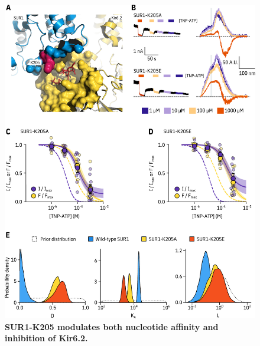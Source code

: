 \documentclass[9pt,lineno, onehalfspacing]{elife_modified}
\begin{document}
\begin{figure}
\begin{fullwidth}
\includegraphics[height=0.95\textheight]{figure_five}
\caption{\textbf{SUR1-K205 modulates both nucleotide affinity and inhibition of Kir6.2.}}
\label{fig:five}
\end{fullwidth}
\end{figure}
\end{document}
